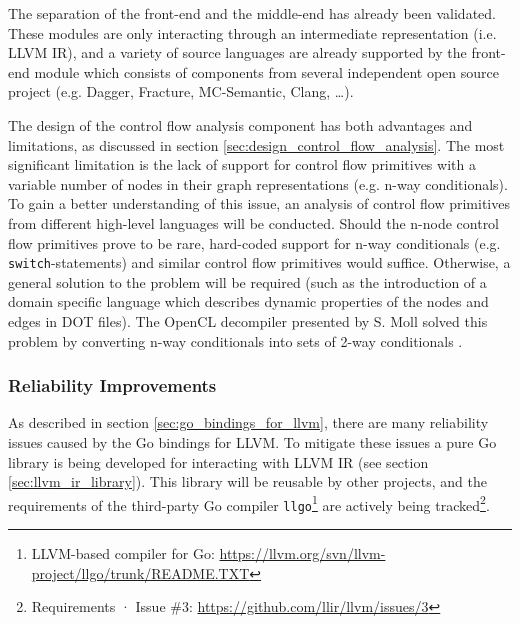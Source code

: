 The separation of the front-end and the middle-end has already been validated. These modules are only interacting through an intermediate representation (i.e. LLVM IR), and a variety of source languages are already supported by the front-end module which consists of components from several independent open source project (e.g. Dagger, Fracture, MC-Semantic, Clang, …).

The design of the control flow analysis component has both advantages and limitations, as discussed in section \ref{sec:design_control_flow_analysis}. The most significant limitation is the lack of support for control flow primitives with a variable number of nodes in their graph representations (e.g. n-way conditionals). To gain a better understanding of this issue, an analysis of control flow primitives from different high-level languages will be conducted. Should the n-node control flow primitives prove to be rare, hard-coded support for n-way conditionals (e.g. \texttt{switch}-statements) and similar control flow primitives would suffice. Otherwise, a general solution to the problem will be required (such as the introduction of a domain specific language which describes dynamic properties of the nodes and edges in DOT files). The OpenCL decompiler presented by S. Moll solved this problem by converting n-way conditionals into sets of 2-way conditionals \cite{decomp_of_llvm}.


\subsubsection{Reliability Improvements}

As described in section \ref{sec:go_bindings_for_llvm}, there are many reliability issues caused by the Go bindings for LLVM. To mitigate these issues a pure Go library is being developed for interacting with LLVM IR (see section \ref{sec:llvm_ir_library}). This library will be reusable by other projects, and the requirements of the third-party Go compiler \texttt{llgo}\footnote{LLVM-based compiler for Go: \url{https://llvm.org/svn/llvm-project/llgo/trunk/README.TXT}} are actively being tracked\footnote{Requirements · Issue \#3: \url{https://github.com/llir/llvm/issues/3}}.

